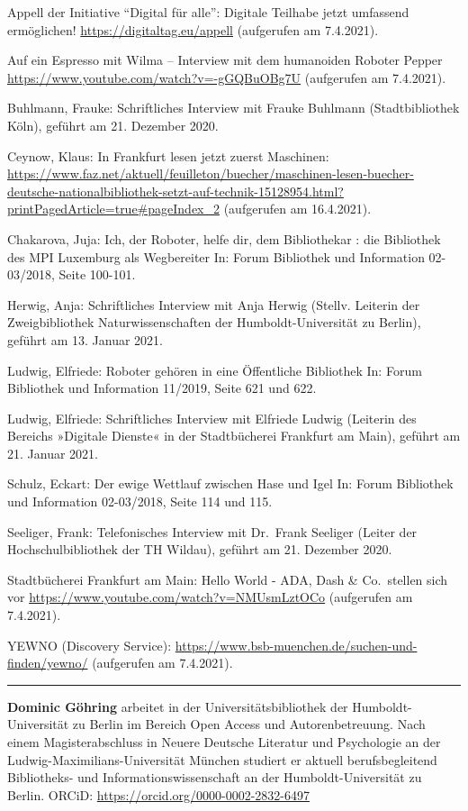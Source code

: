 \documentclass[a4paper,
fontsize=11pt,
oneside,
numbers=noperiodatend,
parskip=half-,
bibliography=totoc,
final
]{scrartcl}
\begin{document}
Appell der Initiative \enquote{Digital für alle}: Digitale Teilhabe
jetzt umfassend ermöglichen! \url{https://digitaltag.eu/appell}
(aufgerufen am 7.4.2021).

Auf ein Espresso mit Wilma -- Interview mit dem humanoiden Roboter
Pepper \url{https://www.youtube.com/watch?v=-gGQBuOBg7U} (aufgerufen am
7.4.2021).

Buhlmann, Frauke: Schriftliches Interview mit Frauke Buhlmann
(Stadtbibliothek Köln), geführt am 21. Dezember 2020.

Ceynow, Klaus: In Frankfurt lesen jetzt zuerst Maschinen:
\url{https://www.faz.net/aktuell/feuilleton/buecher/maschinen-lesen-buecher-deutsche-nationalbibliothek-setzt-auf-technik-15128954.html?printPagedArticle=true\#pageIndex_2}
(aufgerufen am 16.4.2021).

Chakarova, Juja: Ich, der Roboter, helfe dir, dem Bibliothekar : die
Bibliothek des MPI Luxemburg als Wegbereiter In: Forum Bibliothek und
Information 02-03/2018, Seite 100-101.

Herwig, Anja: Schriftliches Interview mit Anja Herwig (Stellv. Leiterin
der Zweigbibliothek Naturwissenschaften der Humboldt-Universität zu
Berlin), geführt am 13. Januar 2021.

Ludwig, Elfriede: Roboter gehören in eine Öffentliche Bibliothek In:
Forum Bibliothek und Information 11/2019, Seite 621 und 622.

Ludwig, Elfriede: Schriftliches Interview mit Elfriede Ludwig (Leiterin
des Bereichs »Digitale Dienste« in der Stadtbücherei Frankfurt am Main),
geführt am 21. Januar 2021.

Schulz, Eckart: Der ewige Wettlauf zwischen Hase und Igel In: Forum
Bibliothek und Information 02-03/2018, Seite 114 und 115.

Seeliger, Frank: Telefonisches Interview mit Dr.~Frank Seeliger (Leiter
der Hochschulbibliothek der TH Wildau), geführt am 21. Dezember 2020.

Stadtbücherei Frankfurt am Main: Hello World - ADA, Dash \& Co.~stellen
sich vor \url{https://www.youtube.com/watch?v=NMUsmLztOCo} (aufgerufen
am 7.4.2021).

YEWNO (Discovery Service):
\url{https://www.bsb-muenchen.de/suchen-und-finden/yewno/} (aufgerufen
am 7.4.2021).

\begin{center}\rule{0.5\linewidth}{0.5pt}\end{center}

\textbf{Dominic Göhring} arbeitet in der Universitätsbibliothek der Humboldt-Universität zu Berlin im Bereich Open Access und Autorenbetreuung. Nach einem Magisterabschluss in Neuere Deutsche Literatur und Psychologie an der Ludwig-Maximilians-Universität München studiert er aktuell berufsbegleitend Bibliotheks- und Informationswissenschaft an der Humboldt-Universität zu Berlin. ORCiD: \url{https://orcid.org/0000-0002-2832-6497}
\end{document}
